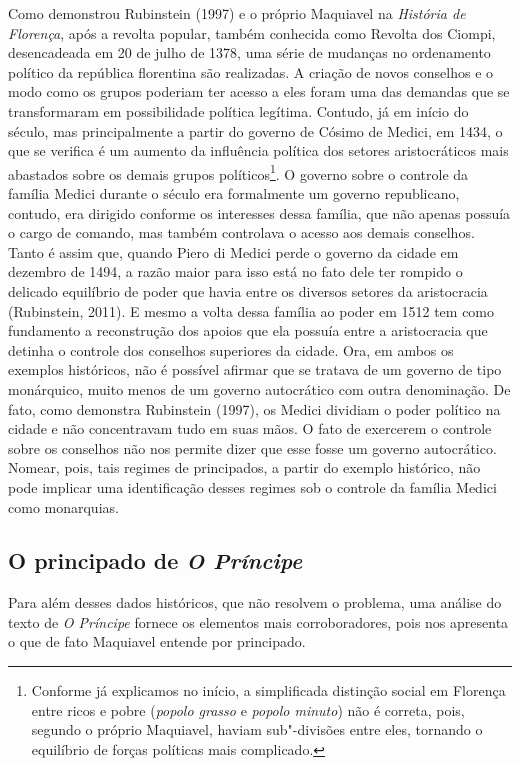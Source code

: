 Como demonstrou Rubinstein (1997) e o próprio Maquiavel na
\emph{História de Florença}, após a revolta popular, também conhecida
como Revolta dos Ciompi, desencadeada em 20 de julho de 1378, uma série
de mudanças no ordenamento político da república florentina são
realizadas. A criação de novos conselhos e o modo como os grupos
poderiam ter acesso a eles foram uma das demandas que se transformaram
em possibilidade política legítima. Contudo, já em início do século, mas
principalmente a partir do governo de Cósimo de Medici, em 1434, o que
se verifica é um aumento da influência política dos setores
aristocráticos mais abastados sobre os demais grupos políticos\footnote{Conforme
  já explicamos no início, a simplificada distinção social em Florença
  entre ricos e pobre (\emph{popolo grasso} e \emph{popolo minuto}) não
  é correta, pois, segundo o próprio Maquiavel, haviam sub"-divisões
  entre eles, tornando o equilíbrio de forças políticas mais complicado.}.
O governo sobre o controle da família Medici durante o século  era
formalmente um governo republicano, contudo, era dirigido conforme os
interesses dessa família, que não apenas possuía o cargo de comando, mas
também controlava o acesso aos demais conselhos. Tanto é assim que,
quando Piero di Medici perde o governo da cidade em dezembro de 1494, a
razão maior para isso está no fato dele ter rompido o delicado
equilíbrio de poder que havia entre os diversos setores da aristocracia
(Rubinstein, 2011). E mesmo a volta dessa família ao poder em 1512 tem
como fundamento a reconstrução dos apoios que ela possuía entre a
aristocracia que detinha o controle dos conselhos superiores da cidade.
Ora, em ambos os exemplos históricos, não é possível afirmar que se
tratava de um governo de tipo monárquico, muito menos de um governo
autocrático com outra denominação. De fato, como demonstra Rubinstein
(1997), os Medici dividiam o poder político na cidade e não concentravam
tudo em suas mãos. O fato de exercerem o controle sobre os conselhos não
nos permite dizer que esse fosse um governo autocrático. Nomear, pois,
tais regimes de principados, a partir do exemplo histórico, não pode
implicar uma identificação desses regimes sob o controle da família
Medici como monarquias.

\subsection{O principado de \emph{O Príncipe}}

Para além desses dados históricos, que não resolvem o problema, uma
análise do texto de \emph{O Príncipe} fornece os elementos mais
corroboradores, pois nos apresenta o que de fato Maquiavel entende por
principado.

